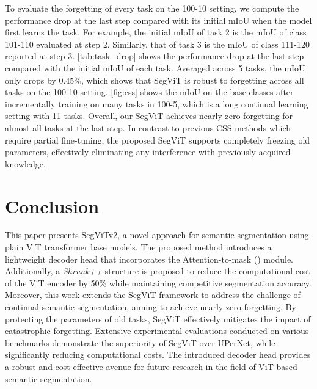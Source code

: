 To evaluate the forgetting of every task on the 100-10 setting, we compute the performance drop at the last step compared with its initial mIoU when the model first learns the task. For example, the initial mIoU of task 2 is the mIoU of class 101-110 evaluated at step 2. Similarly, that of task 3 is the mIoU of class 111-120 reported at step 3. \cref{tab:task_drop} shows the performance drop at the last step compared with the initial mIoU of each task. Averaged across 5 tasks, the mIoU only drops by 0.45\%, which shows that SegViT is robust to forgetting across all tasks on the 100-10 setting.  \cref{fig:css} shows the mIoU on the base classes after incrementally training on many tasks in 100-5, which is a long continual learning setting with 11 tasks. Overall, our SegViT achieves nearly zero forgetting for almost all tasks at the last step. In contrast to previous CSS methods which require partial fine-tuning, the proposed SegViT supports completely freezing old parameters, effectively eliminating any interference with previously acquired knowledge.














 \section{Conclusion}
This paper presents SegViTv2, a novel approach for semantic segmentation using plain ViT transformer base models. The proposed method introduces a lightweight decoder head that incorporates the Attention-to-mask (\atm) module. Additionally, a \emph{Shrunk++} structure is proposed to reduce the computational cost of the ViT encoder by 50\% while maintaining competitive segmentation accuracy. 
Moreover, this work extends the SegViT framework to address the challenge of continual semantic segmentation, aiming to achieve nearly zero forgetting. By protecting the parameters of old tasks, SegViT effectively mitigates the impact of catastrophic forgetting. 
Extensive experimental evaluations conducted on various benchmarks demonstrate the superiority of SegViT over UPerNet, while significantly reducing computational costs. The introduced decoder head provides a robust and cost-effective avenue for future research in the field of ViT-based semantic segmentation.




